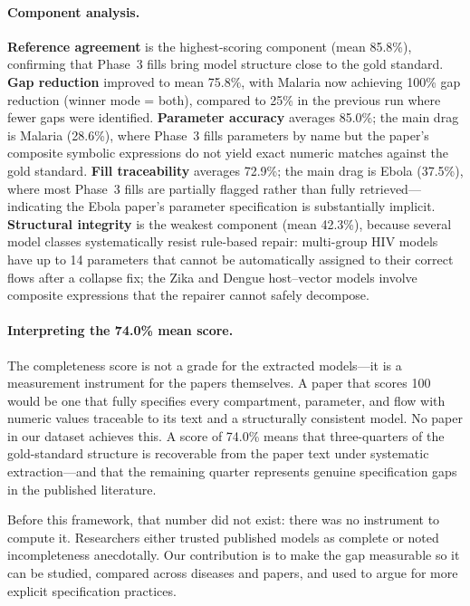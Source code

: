 \paragraph{Component analysis.}
\textbf{Reference agreement} is the highest-scoring component (mean 85.8\%), confirming
that Phase~3 fills bring model structure close to the gold standard.
\textbf{Gap reduction} improved to mean 75.8\%, with Malaria now achieving 100\% gap
reduction (winner mode = both), compared to 25\% in the previous run where fewer gaps
were identified.
\textbf{Parameter accuracy} averages 85.0\%; the main drag is Malaria (28.6\%), where
Phase~3 fills parameters by name but the paper's composite symbolic expressions do not
yield exact numeric matches against the gold standard.
\textbf{Fill traceability} averages 72.9\%; the main drag is Ebola (37.5\%), where most
Phase~3 fills are partially flagged rather than fully retrieved---indicating the Ebola
paper's parameter specification is substantially implicit.
\textbf{Structural integrity} is the weakest component (mean 42.3\%), because several
model classes systematically resist rule-based repair:
multi-group HIV models have up to 14 parameters that cannot be automatically assigned
to their correct flows after a collapse fix; the Zika and Dengue host--vector models
involve composite expressions that the repairer cannot safely decompose.

\paragraph{Interpreting the 74.0\% mean score.}
The completeness score is not a grade for the extracted models---it is a measurement
instrument for the papers themselves. A paper that scores 100 would be one that fully
specifies every compartment, parameter, and flow with numeric values traceable to its
text and a structurally consistent model. No paper in our dataset achieves this.
A score of 74.0\% means that three-quarters of the gold-standard structure is
recoverable from the paper text under systematic extraction---and that the remaining
quarter represents genuine specification gaps in the published literature.

Before this framework, that number did not exist: there was no instrument to compute
it. Researchers either trusted published models as complete or noted incompleteness
anecdotally. Our contribution is to make the gap measurable so it can be studied,
compared across diseases and papers, and used to argue for more explicit specification
practices.

